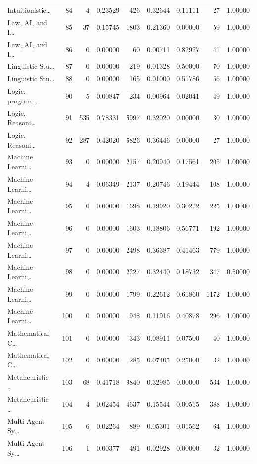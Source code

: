 \begin{table}
\begin{tabular}{lrrrrrrrr}
Intuitionistic… & 84 & 4 & 0.23529 & 426 & 0.32644 & 0.11111 & 27 & 1.00000 \\
Law, AI, and I… & 85 & 37 & 0.15745 & 1803 & 0.21360 & 0.00000 & 59 & 1.00000 \\
Law, AI, and I… & 86 & 0 & 0.00000 & 60 & 0.00711 & 0.82927 & 41 & 1.00000 \\
Linguistic Stu… & 87 & 0 & 0.00000 & 219 & 0.01328 & 0.50000 & 70 & 1.00000 \\
Linguistic Stu… & 88 & 0 & 0.00000 & 165 & 0.01000 & 0.51786 & 56 & 1.00000 \\
Logic, program… & 90 & 5 & 0.00847 & 234 & 0.00964 & 0.02041 & 49 & 1.00000 \\
Logic, Reasoni… & 91 & 535 & 0.78331 & 5997 & 0.32020 & 0.00000 & 30 & 1.00000 \\
Logic, Reasoni… & 92 & 287 & 0.42020 & 6826 & 0.36446 & 0.00000 & 27 & 1.00000 \\
Machine Learni… & 93 & 0 & 0.00000 & 2157 & 0.20940 & 0.17561 & 205 & 1.00000 \\
Machine Learni… & 94 & 4 & 0.06349 & 2137 & 0.20746 & 0.19444 & 108 & 1.00000 \\
Machine Learni… & 95 & 0 & 0.00000 & 1698 & 0.19920 & 0.30222 & 225 & 1.00000 \\
Machine Learni… & 96 & 0 & 0.00000 & 1603 & 0.18806 & 0.56771 & 192 & 1.00000 \\
Machine Learni… & 97 & 0 & 0.00000 & 2498 & 0.36387 & 0.41463 & 779 & 1.00000 \\
Machine Learni… & 98 & 0 & 0.00000 & 2227 & 0.32440 & 0.18732 & 347 & 0.50000 \\
Machine Learni… & 99 & 0 & 0.00000 & 1799 & 0.22612 & 0.61860 & 1172 & 1.00000 \\
Machine Learni… & 100 & 0 & 0.00000 & 948 & 0.11916 & 0.40878 & 296 & 1.00000 \\
Mathematical C… & 101 & 0 & 0.00000 & 343 & 0.08911 & 0.07500 & 40 & 1.00000 \\
Mathematical C… & 102 & 0 & 0.00000 & 285 & 0.07405 & 0.25000 & 32 & 1.00000 \\
Metaheuristic … & 103 & 68 & 0.41718 & 9840 & 0.32985 & 0.00000 & 534 & 1.00000 \\
Metaheuristic … & 104 & 4 & 0.02454 & 4637 & 0.15544 & 0.00515 & 388 & 1.00000 \\
Multi-Agent Sy… & 105 & 6 & 0.02264 & 889 & 0.05301 & 0.01562 & 64 & 1.00000 \\
Multi-Agent Sy… & 106 & 1 & 0.00377 & 491 & 0.02928 & 0.00000 & 32 & 1.00000 \\

\end{tabular}
\end{table}
